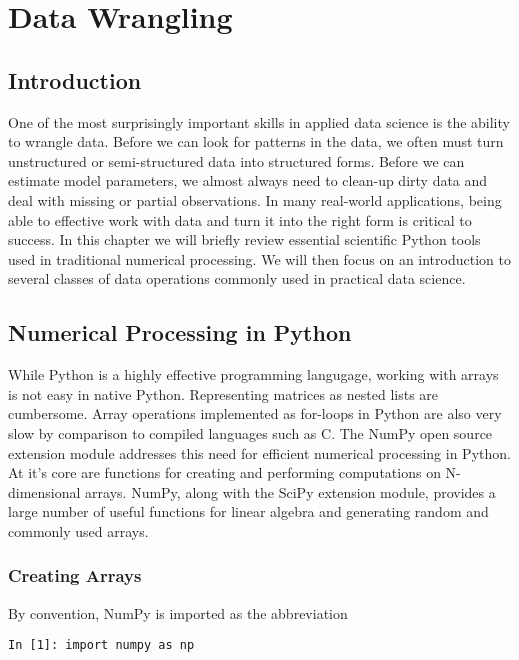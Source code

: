 \chapter{Data Wrangling}
\label{chapter:datawrangling}
\vspace{0.2in}

\section{Introduction}
One of the most surprisingly important skills in applied data science is the ability to wrangle data. Before we can look for patterns in the data, we often must turn unstructured or semi-structured data into structured forms. Before we can estimate model parameters, we almost always need to clean-up dirty data and deal with missing or partial observations. In many real-world applications, being able to effective work with data and turn it into the right form is critical to success. In this chapter we will briefly review essential scientific Python tools used in traditional numerical processing. We will then focus on an introduction to several classes of data operations commonly used in practical data science.

\section{Numerical Processing in Python}
\label{datawrangling:section:numpy}
While Python is a highly effective programming langugage, working with arrays is not easy in native Python. Representing matrices as nested lists are cumbersome. Array operations implemented as for-loops in Python are also very slow by comparison to compiled languages such as C. The NumPy open source extension module addresses this need for efficient numerical processing in Python. At it's core are functions for creating and performing computations on N-dimensional arrays. NumPy, along with the SciPy extension module, provides a large number of useful functions for linear algebra and generating random and commonly used arrays.

\subsection{Creating Arrays}
By convention, NumPy is imported as the abbreviation 

\begin{verbatim}
In [1]: import numpy as np
\end{verbatim}

